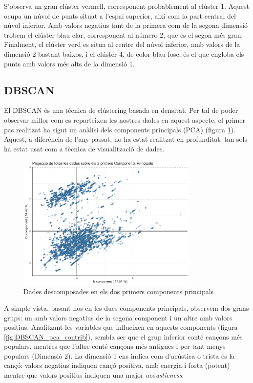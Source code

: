 \documentclass{article}
\begin{document}
S'observa un gran clúster vermell, corresponent probablement al clúster 1. Aquest ocupa un núvol de punts situat a l'espai superior, així com la part central del núvol inferior. Amb valors negatius tant de la primera com de la segona dimensió trobem el clúster blau clar, corresponent al número 2, que és el segon més gran. Finalment, el clúster verd es situa al centre del núvol inferior, amb valors de la dimensió 2 bastant baixos, i el clúster 4, de color blau fosc, és el que engloba els punts amb valors més alts de la dimensió 1.

\subsection{DBSCAN}

El DBSCAN és una tècnica de clústering basada en densitat. Per tal de poder observar millor com es reparteixen les nostres dades en aquest aspecte, el primer pas realitzat ha sigut un anàlisi dels components principals (PCA) (figura \ref{fig:DBSCAN_pca}). Aquest, a diferència de l'any passat, no ha estat realitzat en profunditat: tan sols ha estat usat com a tècnica de visualització de dades.

\begin{figure}[H]
    \centering
    \includegraphics[width=0.8\textwidth]{Images/4_clustering/DBSCAN/dbscanpca.png}
    \caption{Dades descomposades en els dos primers components principals}
    \label{fig:DBSCAN_pca}
\end{figure}

A simple vista, basant-nos en les dues components principals, observem dos grans grups: un amb valors negatius de la segona component i un altre amb valors positius. Analitzant les variables que influeixen en aquests components (figura \ref{fig:DBSCAN_pca_contrib}), sembla ser que el grup inferior conté cançons més populars, mentres que l'altre conté cançons més antigues i per tant menys populars (Dimensió 2). La dimensió 1 ens indica com d'acústica o trista és la cançó: valors negatius indiquen cançó positiva, amb energia i forta (potent) mentre que valors positius indiquen una major \textit{acousticness}.
\end{document}

